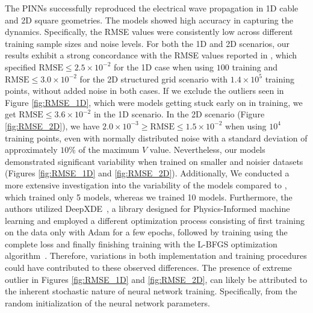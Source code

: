 The PINNs successfully reproduced the electrical wave propagation in 1D cable and 2D square geometries. The models showed high accuracy in capturing the dynamics.  Specifically, the RMSE values were consistently low across different training sample sizes and noise levels. For both the 1D and 2D scenarios, our results exhibit a strong concordance with the RMSE values reported in \cite{EP-PINNs}, which specified $\mathrm{RMSE}\leq 2.5 \times 10^{-2}$ for the 1D case when using $100$ training and $\mathrm{RMSE}\leq 3.0 \times 10^{-2}$ for the 2D structured grid scenario with $1.4\times 10^5$ training points, without added noise in both cases. If we exclude the outliers seen in Figure \ref{fig:RMSE_1D}, which were models getting stuck early on in training, we get $\mathrm{RMSE\leq 3.6\times10^{-2}}$ in the 1D scenario. In the 2D scenario (Figure \ref{fig:RMSE_2D}), we have $2.0\times10^{-3}\geq\mathrm{RMSE}\leq 1.5 \times 10^{-2}$ when using $10^4$ training points, even with normally distributed noise with a standard deviation of approximately $10\%$ of the maximum $V$ value.
Nevertheless, our models demonstrated significant variability when trained on smaller and noisier datasets (Figures \ref{fig:RMSE_1D} and \ref{fig:RMSE_2D}). Additionally, We conducted a more extensive investigation into the variability of the models compared to \cite{EP-PINNs}, which trained only 5 models, whereas we trained 10 models.
 Furthermore, the authors utilized DeepXDE~\cite{lu2021deepxde}, a library designed for Physics-Informed machine learning and employed a different optimization process consisting of first training on the data only with Adam for a few epochs, followed by training using the complete loss and finally finishing training with the L-BFGS optimization algorithm~\cite{L-BFGS}. Therefore, variations in both implementation and training procedures could have contributed to these observed differences.
The presence of extreme outlier in Figures \ref{fig:RMSE_1D} and \ref{fig:RMSE_2D},  can likely be attributed to the inherent stochastic nature of neural network training. Specifically, from the random initialization of the neural network parameters.
